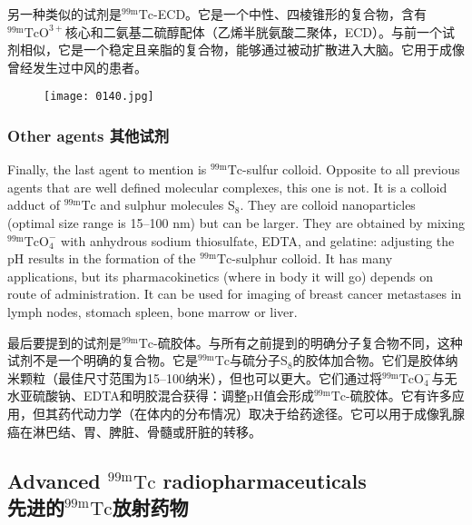 \documentclass[dvipsnames, svgnames,a4paper,11pt]{article}
\begin{document}
另一种类似的试剂是${}^\mathrm{99m}\mathrm{Tc}$-ECD。它是一个中性、四棱锥形的复合物，含有${}^\mathrm{99m}\mathrm{TcO^{3+}}$核心和二氨基二硫醇配体（乙烯半胱氨酸二聚体，ECD）。与前一个试剂相似，它是一个稳定且亲脂的复合物，能够通过被动扩散进入大脑。它用于成像曾经发生过中风的患者。

\begin{figure}[h]
	\centering
    \texttt{[image: 0140.jpg]}    
     \label{fig147}
\end{figure}


\subsubsection{Other agents 其他试剂}

Finally, the last agent to mention is ${}^\mathrm{99m}\mathrm{Tc}$-sulfur colloid. Opposite to all previous
agents that are well defined molecular complexes, this one is not. It is a colloid
adduct of ${}^\mathrm{99m}\mathrm{Tc}$ and sulphur molecules S${}_8$. They are colloid nanoparticles (optimal
size range is 15–100 nm) but can be larger. They are obtained by mixing ${}^\mathrm{99m}\mathrm{TcO_4^-}$
with anhydrous sodium thiosulfate, EDTA, and gelatine: adjusting the pH results in
the formation of the ${}^\mathrm{99m}\mathrm{Tc}$-sulphur colloid. It has many applications, but its
pharmacokinetics (where in body it will go) depends on route of administration. It can
be used for imaging of breast cancer metastases in lymph nodes, stomach spleen,
bone marrow or liver.

最后要提到的试剂是${}^\mathrm{99m}\mathrm{Tc}$-硫胶体。与所有之前提到的明确分子复合物不同，这种试剂不是一个明确的复合物。它是${}^\mathrm{99m}\mathrm{Tc}$与硫分子S${}_8$的胶体加合物。它们是胶体纳米颗粒（最佳尺寸范围为15–100纳米），但也可以更大。它们通过将${}^\mathrm{99m}\mathrm{TcO_4^-}$与无水亚硫酸钠、EDTA和明胶混合获得：调整pH值会形成${}^\mathrm{99m}\mathrm{Tc}$-硫胶体。它有许多应用，但其药代动力学（在体内的分布情况）取决于给药途径。它可以用于成像乳腺癌在淋巴结、胃、脾脏、骨髓或肝脏的转移。

\subsection{Advanced ${}^\mathrm{99m}\mathrm{Tc}$ radiopharmaceuticals \\先进的${}^\mathrm{99m}\mathrm{Tc}$放射药物}
\end{document}
